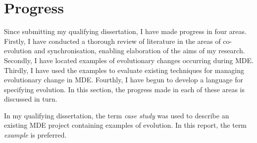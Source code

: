 \section{Progress}
Since submitting my qualifying dissertation, I have made progress in four areas. Firstly, I have conducted a thorough review of literature in the areas of co-evolution and synchronisation, enabling elaboration of the aims of my research. Secondly, I have located examples of evolutionary changes occurring during MDE. Thirdly, I have used the examples to evaluate existing techniques for managing evolutionary change in MDE. Fourthly, I have begun to develop a language for specifying evolution. In this section, the progress made in each of these areas is discussed in turn.

In my qualifying dissertation, the term \emph{case study} was used to describe an existing MDE project containing examples of evolution. In this report, the term \emph{example} is preferred.





